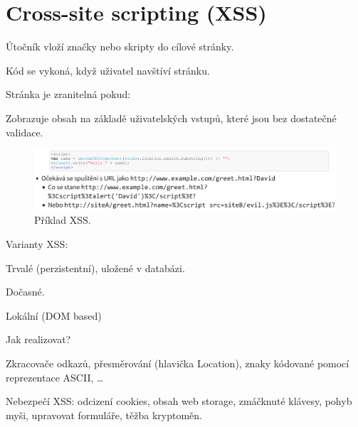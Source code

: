 
\section{Cross-site scripting (XSS)}

\begin{compactitem}
    \item Útočník vloží značky nebo skripty do cílové stránky. \begin{compactitem}
        \item Kód se vykoná, když uživatel navštíví stránku.
    \end{compactitem}

    \item Stránka je zranitelná pokud: \begin{compactitem}
        \item Zobrazuje obsah na základě uživatelských vstupů, které jsou bez dostatečné validace.
    \end{compactitem}

    \begin{figure}[H]
        \centering
        \includegraphics[width=1\linewidth]{xss_priklad.pdf}
        \caption{Příklad XSS.}
    \end{figure}

    \item Varianty XSS: \begin{compactitem}
        \item Trvalé (perzistentní), uložené v databázi.
        \item Dočasné.
        \item Lokální (DOM based)
    \end{compactitem}

    \item Jak realizovat? \begin{compactitem}
        \item Zkracovače odkazů, přesměrování (hlavička Location), znaky kódované pomocí reprezentace ASCII, \ldots
    \end{compactitem}

    \item Nebezpečí XSS: odcizení cookies, obsah web storage, zmáčknuté klávesy, pohyb myši, upravovat formuláře, těžba kryptoměn.


\end{compactitem}
